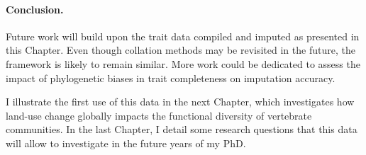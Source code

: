 \paragraph{Conclusion.}
Future work will build upon the trait data compiled and imputed as presented in this Chapter. Even though collation methods may be revisited in the future, the framework is likely to remain similar. More work could be dedicated to assess the impact of phylogenetic biases in trait completeness on imputation accuracy.

I illustrate the first use of this data in the next Chapter, which investigates how land-use change globally impacts the functional diversity of vertebrate communities. In the last Chapter, I detail some research questions that this data will allow to investigate in the future years of my PhD.
